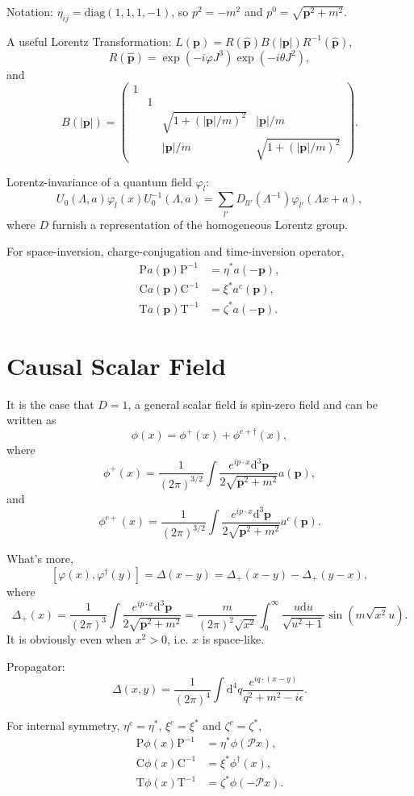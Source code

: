 \documentclass[10pt]{article}
\begin{document}
Notation: $\eta_{ij}=\mathrm{diag}(1,1,1,-1)$, so $p^2=-m^2$ and $p^0=\sqrt{\bm{p}^2+m^2}$.

A useful Lorentz Transformation: $L(\bm{p})=R(\hat{\bm{p}})B(|\bm{p}|)R^{-1}(\hat{\bm{p}})$, 
\[
	R(\hat{\bm{p}})=\exp(-i\varphi J^3)\exp(-i\theta J^2),
\]
and 
\[
	B(|\bm{p}|)=
	\begin{pmatrix}
		1&&&\\
		&1&&\\
		&&\sqrt{1+(|\bm{p}|/m)^2}&|\bm{p}|/m\\
		&&|\bm{p}|/m&\sqrt{1+(|\bm{p}|/m)^2}
	 \end{pmatrix}.
\]

Lorentz-invariance of a quantum field $\varphi_l$:
\[
	U_0(\Lambda,a)\varphi_l(x)U_0^{-1}(\Lambda,a)=\sum_{l'}D_{ll'}(\Lambda^{-1})\varphi_{l'}(\Lambda x+a),
\]
where $D$ furnish a representation of the homogeneous Lorentz group.

For space-inversion, charge-conjugation and time-inversion operator,
\begin{align*}
	\mathrm{P}a(\bm{p})\mathrm{P}^{-1}&=\eta^*a(-\bm{p}),\\
	\mathrm{C}a(\bm{p})\mathrm{C}^{-1}&=\xi^*a^c(\bm{p}),\\
	\mathrm{T}a(\bm{p})\mathrm{T}^{-1}&=\zeta^*a(-\bm{p}).
\end{align*}

\section{Causal Scalar Field}
It is the case that $D=1$, a general scalar field is spin-zero field and can be written as
\[
	\phi(x)=\phi^+(x)+\phi^{c+\dag}(x),
\]
where
\[
	\phi^+(x)=\frac{1}{(2\pi)^{3/2}}\int \frac{e^{ip\cdot x}\mathrm{d}^3\bm{p}}{2\sqrt{\bm{p}^2+m^2}}a(\bm{p}),
\]
and
\[
	\phi^{c+}(x)=\frac{1}{(2\pi)^{3/2}}\int \frac{e^{ip\cdot x}\mathrm{d}^3\bm{p}}{2\sqrt{\bm{p}^2+m^2}}a^c(\bm{p}).
\]

What's more,
\[
	[\varphi(x),\varphi^\dag(y)]=\Delta(x-y)=\Delta_+(x-y)-\Delta_+(y-x),
\]
where
\[
	\Delta_+(x)=\frac{1}{(2\pi)^3}\int  \frac{e^{ip\cdot x}\mathrm{d}^3\bm{p}}{2\sqrt{\bm{p}^2+m^2}}=\frac{m}{(2\pi)^2\sqrt{x^2}}\int_0^\infty  \frac{u\mathrm{d} u}{\sqrt{u^2+1}}\sin(m\sqrt{x^2}u).
\]
It is obviously even when $x^2>0$, i.e. $x$ is space-like.

Propagator:
\[
	\Delta(x,y)=\frac{1}{(2\pi)^4}\int \mathrm{d}^4q \frac{e^{iq\cdot (x-y)}}{q^2+m^2-i\epsilon}.
\]

For internal symmetry, $\eta^c=\eta^*$, $\xi^c=\xi^*$ and $\zeta^c=\zeta^*$,
\[
\begin{split}
	\mathrm{P}\phi(x)\mathrm{P}^{-1}&=\eta^*\phi(\mathscr{P}x),\\
	\mathrm{C}\phi(x)\mathrm{C}^{-1}&=\xi^*\phi^{\dag}(x),\\
	\mathrm{T}\phi(x)\mathrm{T}^{-1}&=\zeta^*\phi(-\mathscr{P}x).
\end{split}
\]
\end{document}
